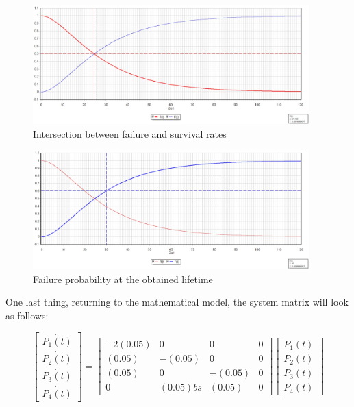 \documentclass{article}
\begin{document}
\begin{doublespacing}
\begin{figure}[H] 
    \centering
    \includegraphics[width=0.95\textwidth]{Images/FSIdIn.JPG} 
    \caption{Intersection between failure and survival rates } 
    \label{fig:IDIN} 
\end{figure}

\begin{figure}[H] 
    \centering
    \includegraphics[width=0.95\textwidth]{Images/FSIdTL.JPG} 
    \caption{Failure probability at the obtained lifetime} 
    \label{fig:IDTL} 
\end{figure}

\par One last thing, returning to the mathematical model, the system matrix will look as follows:

\begin{equation}
\begin{bmatrix}
\dot{P_1 (t)}\\
\dot{P_2 (t)}\\
\dot{P_3 (t)}\\
\dot{P_4 (t)}
\end{bmatrix}
= 
\begin{bmatrix}
-2(0.05) & 0 & 0 & 0\\
 (0.05) & -(0.05) & 0 & 0\\
 (0.05) & 0 & -(0.05)& 0\\
 0 & (0.05)bs & (0.05) & 0
\end{bmatrix}
\begin{bmatrix}
P_1 (t)\\
P_2 (t)\\
P_3 (t)\\
P_4 (t)
\end{bmatrix}
\end{equation}


\end{doublespacing}
\end{document}
